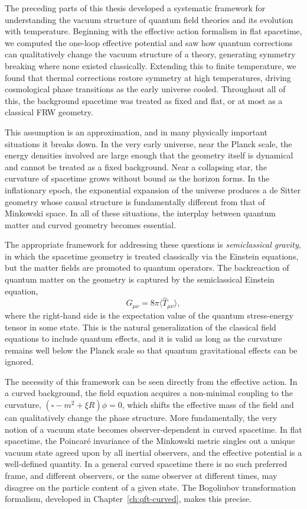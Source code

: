 The preceding parts of this thesis developed a systematic framework for
understanding the vacuum structure of quantum field theories and its
evolution with temperature. Beginning with the effective action
formalism in flat spacetime, we computed the one-loop effective
potential and saw how quantum corrections can qualitatively change the
vacuum structure of a theory, generating symmetry breaking where none
existed classically. Extending this to finite temperature, we found
that thermal corrections restore symmetry at high temperatures, driving
cosmological phase transitions as the early universe cooled. Throughout
all of this, the background spacetime was treated as fixed and flat, or
at most as a classical FRW geometry.

This assumption is an approximation, and in many physically important
situations it breaks down. In the very early universe, near the Planck
scale, the energy densities involved are large enough that the geometry
itself is dynamical and cannot be treated as a fixed background. Near
a collapsing star, the curvature of spacetime grows without bound as
the horizon forms. In the inflationary epoch, the exponential expansion
of the universe produces a de Sitter geometry whose causal structure is
fundamentally different from that of Minkowski space. In all of these
situations, the interplay between quantum matter and curved geometry
becomes essential.

The appropriate framework for addressing these questions is
\emph{semiclassical gravity}, in which the spacetime geometry is
treated classically via the Einstein equations, but the matter fields
are promoted to quantum operators. The backreaction of quantum matter
on the geometry is captured by the semiclassical Einstein equation,
\begin{equation}
    G_{\mu\nu} = 8\pi\langle\hat T_{\mu\nu}\rangle,
\end{equation}
where the right-hand side is the expectation value of the
quantum stress-energy tensor in some state. This is the natural
generalization of the classical field equations to include quantum
effects, and it is valid as long as the curvature remains well below
the Planck scale so that quantum gravitational effects can be ignored.

The necessity of this framework can be seen directly from the
effective action. In a curved background, the field equation acquires
a non-minimal coupling to the curvature,
$(\square - m^2 + \xi R)\phi = 0$, which shifts the effective mass of
the field and can qualitatively change the phase structure. More
fundamentally, the very notion of a vacuum state becomes
observer-dependent in curved spacetime. In flat spacetime, the
Poincar\'{e} invariance of the Minkowski metric singles out a unique
vacuum state agreed upon by all inertial observers, and the effective
potential is a well-defined quantity. In a general curved spacetime
there is no such preferred frame, and different observers, or the same
observer at different times, may disagree on the particle content of a
given state. The Bogoliubov transformation formalism, developed in
Chapter~\ref{ch:qft-curved}, makes this precise.

